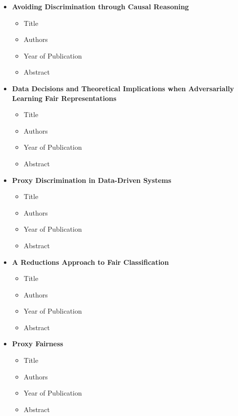 \documentclass{article}
\begin{document}
\begin{itemize}
        \item \textbf{Avoiding Discrimination through Causal Reasoning}
        \begin{itemize}
            \item Title
            \item Authors
            \item Year of Publication
            \item Abstract
        \end{itemize}
        
        \item \textbf{Data Decisions and Theoretical Implications when Adversarially Learning Fair Representations}
        \begin{itemize}
            \item Title
            \item Authors
            \item Year of Publication
            \item Abstract
        \end{itemize}
        
        \item \textbf{Proxy Discrimination in Data-Driven Systems}
        \begin{itemize}
            \item Title
            \item Authors
            \item Year of Publication
            \item Abstract
        \end{itemize}
        
        \item \textbf{A Reductions Approach to Fair Classification}
        \begin{itemize}
            \item Title
            \item Authors
            \item Year of Publication
            \item Abstract
        \end{itemize}
        
        \item \textbf{Proxy Fairness}
        \begin{itemize}
            \item Title
            \item Authors
            \item Year of Publication
            \item Abstract
        \end{itemize}
        

\end{itemize}
\end{document}

